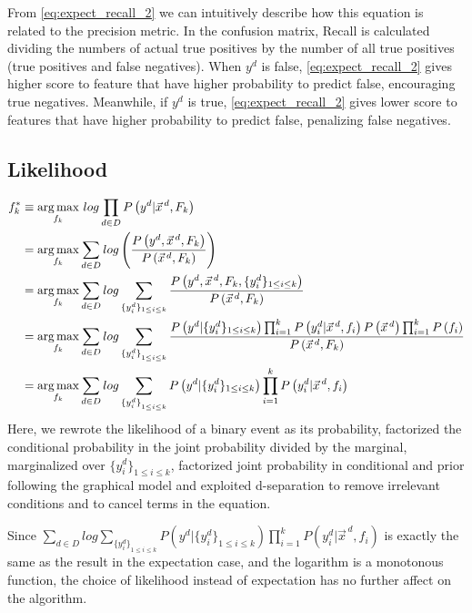 From \eqref{eq:expect_recall_2} we can intuitively describe how this equation is related to the precision metric. In the confusion matrix, Recall is calculated dividing the numbers of actual true positives by the number of all true positives (true positives and false negatives). When $y^d$ is false, \eqref{eq:expect_recall_2} gives higher score to feature that have higher probability to predict false, encouraging true negatives. Meanwhile, if $y^d$ is true, \eqref{eq:expect_recall_2} gives lower score to features that have higher probability to predict false, penalizing false negatives.

\subsection{Likelihood}
\begin{align}
f_k^*&\equiv\argmax_{f_k}\,log\prod_{d\in D}P\left(y^d|\vec{x}^{\,d},F_k\right)\nonumber\\
&=\argmax_{f_k}\sum_{d\in D}log\left(\frac{P\left(y^d,\vec{x}^{\,d},F_k\right)}{P\left(\vec{x}^{\,d},F_k\right)}\right)\nonumber\\
&=\argmax_{f_k}\sum_{d\in D}log\sum_{\{y_i^d\}_{1\leq i\leq k}}\frac{P\left(y^d,\vec{x}^{\,d}, F_k,\{y_i^d\}_{1\leq i\leq k}\right)}{P\left(\vec{x}^{\,d},F_k\right)}\nonumber\\
&=\argmax_{f_k} \sum_{d \in D} log\sum_{{\{y_i^d\}}_{1\leq i \leq k}} \frac{P\left(y^d| \{y^d_i\}_{1 \leq i \leq k}\right) \prod_{i=1}^kP\left(y_i^d|\vec{x}^{\,d},f_i\right)P\left(\vec{x}^{\,d}\right)\prod_{i=1}^kP\left(f_i\right)}{P\left(\vec{x}^{\,d}, F_k\right)}\nonumber\\
&=\argmax_{f_k}\sum_{d\in D}log\sum_{{\{y_i^d\}}_{1\leq i\leq k}}P\left(y^d|\{y^d_i\}_{1\leq i\leq k}\right)\prod_{i=1}^kP\left(y_i^d|\vec{x}^{\,d},f_i\right)\nonumber
\end{align}
Here, we rewrote the likelihood of a binary event as its probability, factorized the conditional probability in the joint probability divided by the marginal, marginalized over $\{y^d_i\}_{1\leq i\leq k}$, factorized joint probability in conditional and prior following the graphical model and exploited d-separation to remove irrelevant conditions and to cancel terms in the equation.

Since $\sum_{d\in D}log\sum_{{\{y_i^d\}}_{1\leq i\leq k}}P\left(y^d|\{y^d_i\}_{1\leq i\leq k}\right)\prod_{i=1}^kP\left(y_i^d|\vec{x}^{\,d},f_i\right)$ is exactly the same as the result in the expectation case, and the logarithm is a monotonous function, the choice of likelihood instead of expectation has no further affect on the algorithm.
